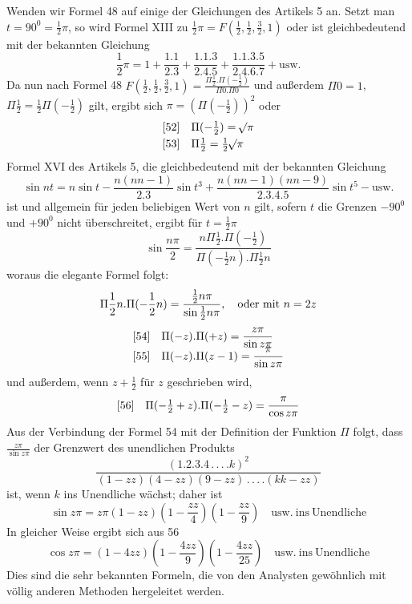 Wenden wir Formel 48 auf einige der Gleichungen des Artikels 5 an. Setzt man $t=90^0=\frac12\pi$, so wird Formel XIII zu $\frac12\pi=F(\frac12,\frac12,\frac32,1)$ oder ist gleichbedeutend mit der bekannten Gleichung
\[
\frac12\pi=1+\frac{1.1}{2.3}+\frac{1.1.3}{2.4.5}
+\frac{1.1.3.5}{2.4.6.7}+\mathrm{usw.}
\]
Da nun nach Formel 48 $F(\frac12,\frac12,\frac32,1)=\frac{\Pi\frac12.\Pi(-\frac12)}{\Pi0.\Pi0}$ und außerdem $\Pi0=1$, $\Pi\frac12=\frac12\Pi(-\frac12)$ gilt, ergibt sich $\pi=(\Pi(-\frac12))^2$ oder
\[
\begin{array}{@{}ll@{}}
[52]&\displaystyle\Pi(-\tfrac12)=\BareRoot{\pi}\\[3pt]
[53]&\displaystyle\Pi\tfrac12=\tfrac12\BareRoot{\pi}
\end{array}
\]
Formel XVI des Artikels 5, die gleichbedeutend mit der bekannten Gleichung
\[
\sin nt=n\sin t-\frac{n(nn-1)}{2.3}\sin t^3
+\frac{n(nn-1)(nn-9)}{2.3.4.5}\sin t^5-\mathrm{usw.}
\]
ist und allgemein für jeden beliebigen Wert von $n$ gilt, sofern $t$ die Grenzen $-90^0$ und $+90^0$ nicht überschreitet, ergibt für $t=\frac12\pi$
\[
\sin\frac{n\pi}{2}=
\frac{n\Pi\frac12.\Pi(-\frac12)}{\Pi(-\frac12n).\Pi\frac12n}
\]
woraus die elegante Formel folgt:
\[
\Pi\frac12n.\Pi(-\frac12n)=\frac{\frac12n\pi}{\sin\frac12n\pi},
\quad\hbox{oder mit }n=2z
\]
\[
\begin{array}{@{}ll@{}}
[54]&\displaystyle\Pi(-z).\Pi(+z)=\frac{z\pi}{\sin z\pi}\\[3pt]
[55]&\displaystyle\Pi(-z).\Pi(z-1)=\frac{\pi}{\sin z\pi}
\end{array}
\]
und außerdem, wenn $z+\frac12$ für $z$ geschrieben wird,
\[
\begin{array}{@{}ll@{}}
[56]&\displaystyle\Pi(-\tfrac12+z).\Pi(-\tfrac12-z)=\frac{\pi}{\cos z\pi}
\end{array}
\]
Aus der Verbindung der Formel 54 mit der Definition der Funktion $\Pi$ folgt, dass $\frac{z\pi}{\sin z\pi}$ der Grenzwert des unendlichen Produkts
\[
\frac{(1.2.3.4\,.\,.\,.\,.k)^2}
{(1-zz)(4-zz)(9-zz)\,.\,.\,.\,.(kk-zz)}
\]
ist, wenn $k$ ins Unendliche wächst; daher ist
\[
\sin z\pi=z\pi(1-zz)(1-\frac{zz}{4})(1-\frac{zz}{9})\quad
\mathrm{usw.\ ins\ Unendliche}
\]
In gleicher Weise ergibt sich aus 56
\[
\cos z\pi=(1-4zz)(1-\frac{4zz}{9})(1-\frac{4zz}{25})\quad
\mathrm{usw.\ ins\ Unendliche}
\]
Dies sind die sehr bekannten Formeln, die von den Analysten gewöhnlich mit völlig anderen Methoden hergeleitet werden.

